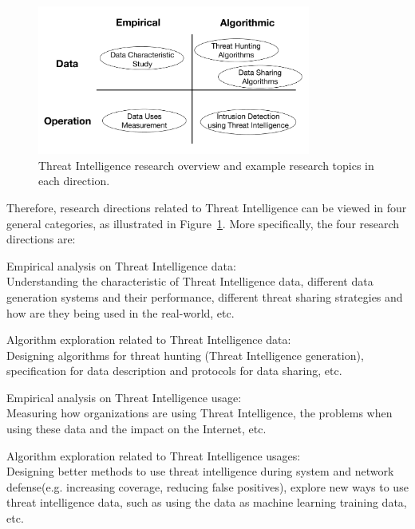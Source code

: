 \begin{figure}
\centering
\includegraphics[width=0.8\textwidth]{threat_intel_research_overview.pdf}
\caption{Threat Intelligence research overview and example research
topics in each direction.}
\label{fig:threat_intel_overview}
\end{figure}

Therefore, research directions related to Threat Intelligence can be 
viewed in four general categories, as illustrated in
Figure~\ref{fig:threat_intel_overview}. More specifically, the four 
research directions are: 
\begin{prettylist}
    \item Empirical analysis on Threat Intelligence data: \\
    Understanding the characteristic of Threat Intelligence data, different
    data generation systems and their performance, different threat sharing
    strategies and how are they being used in the real-world, etc.
    
    \item Algorithm exploration related to Threat Intelligence data: \\
    Designing algorithms for threat hunting (Threat Intelligence generation),
    specification for data description and protocols for data sharing, etc.
    
    \item Empirical analysis on Threat Intelligence usage: \\
    Measuring how organizations are using Threat Intelligence, the problems 
    when using these data and the impact on the Internet, etc.
    
    \item Algorithm exploration related to Threat Intelligence usages: \\
    Designing better methods to use threat intelligence during system and 
    network defense(e.g. increasing coverage, reducing false positives),
    explore new ways to use threat intelligence data, such as using the 
    data as machine learning training data, etc.
\end{prettylist}


